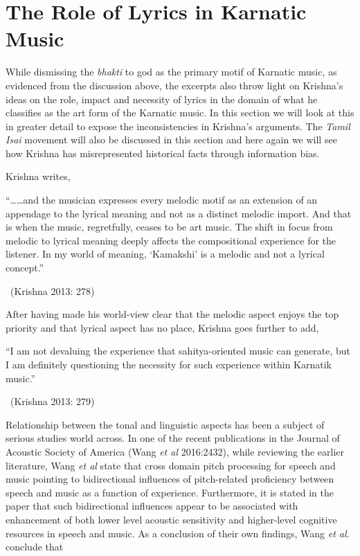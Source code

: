 \vspace{-.3cm}

\section*{The Role of Lyrics in Karnatic Music }

\vspace{-.2cm}

While dismissing the \textit{bhakti} to god as the primary motif of Karnatic music, as evidenced from the discussion above, the excerpts also throw light on Krishna’s ideas on the role, impact and necessity of lyrics in the domain of what he classifies as the art form of the Karnatic music. In this section we will look at this in greater detail to expose the inconsistencies in Krishna’s arguments. The \textit{Tamil Isai} movement will also be discussed in this section and here again we will see how Krishna has misrepresented historical facts through information bias.

Krishna writes,

\begin{myquote}
“……and the musician expresses every melodic motif as an extension of an appendage to the lyrical meaning and not as a distinct melodic import. And that is when the music, regretfully, ceases to be art music. The shift in focus from melodic to lyrical meaning deeply affects the compositional experience for the listener. In my world of meaning, ‘Kamakshi’ is a melodic and not a lyrical concept.” 

~\hfill (Krishna 2013: 278)
\end{myquote}

After having made his world-view clear that the melodic aspect enjoys the top priority and that lyrical aspect has no place, Krishna goes further to add,

\begin{myquote}
“I am not devaluing the experience that sahitya-oriented music can generate, but I am definitely questioning the necessity for such experience within Karnatik music.” 

~\hfill (Krishna 2013: 279)
\end{myquote}

Relationship between the tonal and linguistic aspects has been a subject of serious studies world across. In one of the recent publications in the Journal of Acoustic Society of America (Wang \textit{et al} 2016:2432), while reviewing the earlier literature, Wang \textit{et al} state that cross domain pitch processing for speech and music pointing to bidirectional influences of pitch-related proficiency between speech and music as a function of experience. Furthermore, it is stated in the paper that such bidirectional influences appear to be associated with enhancement of both lower level acoustic sensitivity and higher-level cognitive resources in speech and music. As a conclusion of their own findings, Wang \textit{et al.} conclude that

